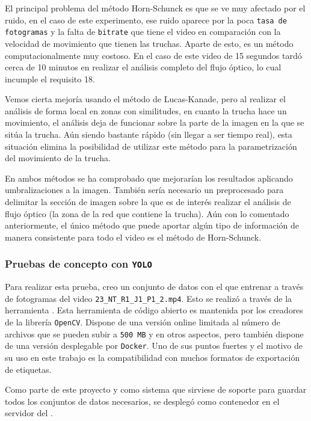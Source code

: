 El principal problema del método Horn-Schunck es que se ve muy afectado por el ruido, en el caso de este experimento, ese ruido aparece por la poca \texttt{tasa de fotogramas} y la falta de \texttt{bitrate} 
que tiene el video en comparación con la velocidad de movimiento que tienen las truchas. Aparte de esto, es un método computacionalmente muy costoso. En el caso de este video de 15 segundos tardó cerca de 10 
minutos en realizar el análisis completo del flujo óptico, lo cual incumple el requisito 18.

Vemos cierta mejoría usando el método de Lucas-Kanade, pero al realizar el análisis de forma local en zonas con similitudes, en cuanto la trucha hace un movimiento, el análisis deja de funcionar 
sobre la parte de la imagen en la que se sitúa la trucha. Aún siendo bastante rápido (sin llegar a ser tiempo real), esta situación elimina la posibilidad de utilizar este método para la 
parametrización del movimiento de la trucha.

En ambos métodos se ha comprobado que mejorarían los resultados aplicando umbralizaciones a la imagen. También sería necesario un preprocesado para delimitar la sección de 
imagen sobre la que es de interés realizar el análisis de flujo óptico (la zona de la red que contiene la trucha). Aún con lo comentado anteriormente, el único método que puede aportar algún 
tipo de información de manera consistente para todo el video es el método de Horn-Schunck.

\subsubsection{Pruebas de concepto con \texttt{YOLO}}

Para realizar esta prueba, creo un conjunto de datos con el que entrenar a través de fotogramas del video \verb|23_NT_R1_J1_P1_2.mp4|. Esto se realizó a través de la herramienta \texttt{}.\newline
Esta herramienta de código abierto\cite{cvat.aicorporationComputerVisionAnnotation2023} es mantenida por los creadores de la librería \texttt{OpenCV}. Dispone de una versión online limitada al número de 
archivos que se pueden subir a \texttt{500 MB} y en otros aspectos, pero también dispone de una versión desplegable por \texttt{Docker}. Uno de sus puntos fuertes y el motivo de su uso en este trabajo es 
la compatibilidad con muchos formatos de exportación de etiquetas.

Como parte de este proyecto y como sistema que sirviese de soporte para guardar todos los conjuntos de datos necesarios, se desplegó como contenedor en el servidor  del .

